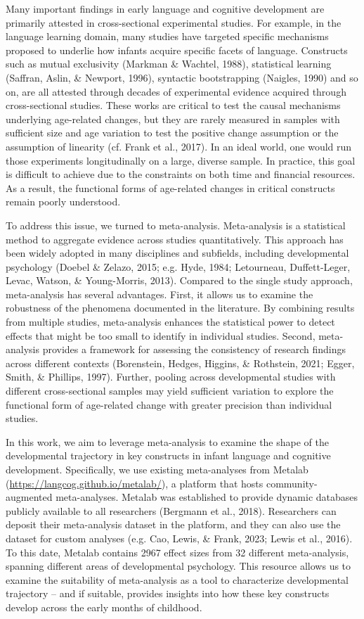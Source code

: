 \documentclass[
  man]{apa6}
\begin{document}
Many important findings in early language and cognitive development are primarily attested in cross-sectional experimental studies. For example, in the language learning domain, many studies have targeted specific mechanisms proposed to underlie how infants acquire specific facets of language. Constructs such as mutual exclusivity (Markman \& Wachtel, 1988), statistical learning (Saffran, Aslin, \& Newport, 1996), syntactic bootstrapping (Naigles, 1990) and so on, are all attested through decades of experimental evidence acquired through cross-sectional studies. These works are critical to test the causal mechanisms underlying age-related changes, but they are rarely measured in samples with sufficient size and age variation to test the positive change assumption or the assumption of linearity (cf. Frank et al., 2017). In an ideal world, one would run those experiments longitudinally on a large, diverse sample. In practice, this goal is difficult to achieve due to the constraints on both time and financial resources. As a result, the functional forms of age-related changes in critical constructs remain poorly understood.

To address this issue, we turned to meta-analysis. Meta-analysis is a statistical method to aggregate evidence across studies quantitatively. This approach has been widely adopted in many disciplines and subfields, including developmental psychology (Doebel \& Zelazo, 2015; e.g. Hyde, 1984; Letourneau, Duffett-Leger, Levac, Watson, \& Young-Morris, 2013). Compared to the single study approach, meta-analysis has several advantages. First, it allows us to examine the robustness of the phenomena documented in the literature. By combining results from multiple studies, meta-analysis enhances the statistical power to detect effects that might be too small to identify in individual studies. Second, meta-analysis provides a framework for assessing the consistency of research findings across different contexts (Borenstein, Hedges, Higgins, \& Rothstein, 2021; Egger, Smith, \& Phillips, 1997). Further, pooling across developmental studies with different cross-sectional samples may yield sufficient variation to explore the functional form of age-related change with greater precision than individual studies.

In this work, we aim to leverage meta-analysis to examine the shape of the developmental trajectory in key constructs in infant language and cognitive development. Specifically, we use existing meta-analyses from Metalab (\url{https://langcog.github.io/metalab/}), a platform that hosts community-augmented meta-analyses. Metalab was established to provide dynamic databases publicly available to all researchers (Bergmann et al., 2018). Researchers can deposit their meta-analysis dataset in the platform, and they can also use the dataset for custom analyses (e.g. Cao, Lewis, \& Frank, 2023; Lewis et al., 2016). To this date, Metalab contains 2967 effect sizes from 32 different meta-analysis, spanning different areas of developmental psychology. This resource allows us to examine the suitability of meta-analysis as a tool to characterize developmental trajectory -- and if suitable, provides insights into how these key constructs develop across the early months of childhood.
\end{document}
